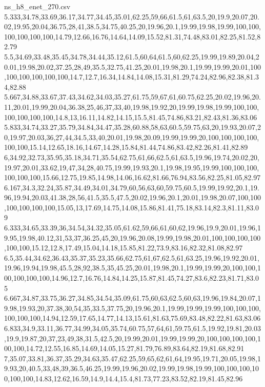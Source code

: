 \begin{filecontents*}[overwrite]{ns_h8_enet_270.csv}
5.333,34.78,33.69,36.17,34.77,34.45,35.01,62.25,59,66,61.5,61,63.5,20,19.9,20.07,20.02,19.95,20.04,36.75,28,41,38.5,34.75,40.25,20,19.96,20.1,19.99,19.98,19.99,100,100,100,100,100,100,14.79,12.66,16.76,14.64,14.09,15.52,81.31,74.48,83.01,82.25,81.52,82.79
5.5,34.69,33.48,35.45,34.78,34.44,35.12,61.5,60,64,61.5,60,62.25,19.99,19.89,20.04,20.01,19.98,20.02,37.25,28,49,35.5,32.75,41.25,20.01,19.98,20.1,19.99,19.99,20.01,100,100,100,100,100,100,14.7,12.7,16.34,14.84,14.08,15.31,81.29,74.24,82.96,82.38,81.34,82.88
5.667,34.88,33.67,37.43,34.62,34.03,35.27,61.75,59,67,61,60.75,62.25,20.02,19.96,20.11,20.01,19.99,20.04,36.38,25,46,37,33,40,19.98,19.92,20,19.99,19.98,19.99,100,100,100,100,100,100,14.8,13,16.11,14.82,14.15,15.5,81.45,74.86,83.21,82.43,81.36,83.06
5.833,34.74,33.27,35.79,34.84,34.47,35.28,60.88,58,63,60.5,59.75,63,20,19.93,20.07,20,19.97,20.03,36,27,44,34.5,33,40,20.01,19.98,20.09,19.99,19.99,20,100,100,100,100,100,100,15.14,12.65,18.16,14.67,14.28,15.84,81.44,74.86,83.42,82.26,81.41,82.89
6,34.92,32.73,35.95,35.18,34.71,35.54,62.75,61,66,62.5,61,63.5,19.96,19.74,20.02,20,19.97,20.01,33.62,19,47,34,28,40.75,19.99,19.93,20.1,19.98,19.95,19.99,100,100,100,100,100,100,15.66,12.75,19.85,14.98,14.06,16.62,81.66,76.94,83.56,82.25,81.05,82.97
6.167,34.3,32.24,35.87,34.49,34.01,34.79,60,56,63,60,59.75,60.5,19.99,19.92,20.1,19.96,19.94,20.03,41.38,28,56,41.5,35.5,47.5,20.02,19.96,20.1,20.01,19.98,20.07,100,100,100,100,100,100,15.05,13,17.69,14.75,14.08,15.86,81.41,75.18,83.14,82.3,81.11,83.09
6.333,34.65,33.39,36,34.54,34.32,35.05,61.62,59,66,61,60,62,19.96,19.9,20.01,19.96,19.95,19.98,40.12,31,53,37,36.25,45,20,19.96,20.08,19.99,19.98,20.01,100,100,100,100,100,100,15.12,12.8,17.49,15.04,14.18,15.85,81.22,73.9,83.16,82.32,81.08,82.97
6.5,35.44,34.62,36.43,35.37,35.23,35.66,62.75,61,67,62.5,61,63.25,19.96,19.92,20.01,19.96,19.94,19.98,45.5,28,92,38.5,35,45.25,20.01,19.98,20.1,19.99,19.99,20,100,100,100,100,100,100,14.96,12.7,16.76,14.84,14.25,15.87,81.45,74.27,83.6,82.23,81.71,83.05
6.667,34.87,33.75,36.27,34.85,34.54,35.09,61.75,60,63,62.5,60,63,19.96,19.84,20.07,19.98,19.93,20,37.38,30,54,35,33.5,37.75,20,19.96,20.1,19.99,19.99,19.99,100,100,100,100,100,100,14.94,12.59,17.65,14.77,14.13,15.61,81.63,75.69,83.48,82.22,81.63,83.06
6.833,34.9,33.11,36.77,34.99,34.05,35.74,60.75,57,64,61,59.75,61.5,19.92,19.81,20.03,19.9,19.87,20,37,23,49,38,31.5,42.5,20,19.99,20.01,19.99,19.99,20,100,100,100,100,100,100,14.72,12.55,16.85,14.69,14.05,15.27,81.79,76.89,83.64,82.19,81.68,82.91
7,35.07,33.81,36.37,35.29,34.63,35.47,62.25,59,65,62,61,64,19.95,19.71,20.05,19.98,19.93,20,40.5,33,48,39,36.5,46.25,19.99,19.96,20.02,19.99,19.98,19.99,100,100,100,100,100,100,14.83,12.62,16.59,14.9,14.4,15.4,81.73,77.23,83.52,82.19,81.45,82.96

\end{filecontents*}
